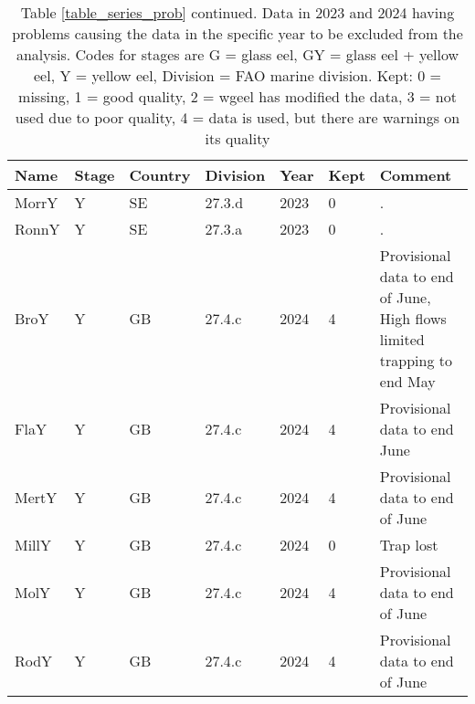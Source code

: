 \begin{table}[htbp]
\centering
\caption{Table \ref{table_series_prob} continued. Data in 2023 and 2024 having problems causing the data in the specific year to be excluded from the analysis. Codes for stages are G = glass eel, GY = glass eel + yellow eel, Y = yellow eel, Division = FAO marine division. Kept: 0 = missing, 1 = good quality,
              2 = wgeel has modified the data, 3 = not used due to poor quality, 4 =	data is used, but there are warnings on its quality} 
\label{table_series_prob2}
\begin{tabular}{p{1.5cm}p{1.5cm}p{1.5cm}p{1cm}p{1cm}p{1cm}p{8cm}}
  \hline
Name & Stage & Country & Division & Year & Kept & Comment \\ 
  \hline
MorrY & Y & SE & 27.3.d & 2023 &   0 & . \\ 
  RonnY & Y & SE & 27.3.a & 2023 &   0 & . \\ 
  BroY & Y & GB & 27.4.c & 2024 &   4 & Provisional data to end of June, High flows limited trapping to end May \\ 
  FlaY & Y & GB & 27.4.c & 2024 &   4 & Provisional data to end June \\ 
  MertY & Y & GB & 27.4.c & 2024 &   4 & Provisional data to end of June \\ 
  MillY & Y & GB & 27.4.c & 2024 &   0 & Trap lost \\ 
  MolY & Y & GB & 27.4.c & 2024 &   4 & Provisional data to end of June \\ 
  RodY & Y & GB & 27.4.c & 2024 &   4 & Provisional data to end of June \\ 
   \hline
\end{tabular}
\end{table}
